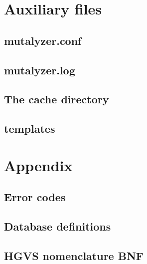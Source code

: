 \documentclass{article}
\begin{document}
\section{Auxiliary files}

\subsection{mutalyzer.conf}

\subsection{mutalyzer.log}

\subsection{The cache directory}

\subsection{templates}

\newpage

\appendix

\section{Appendix}

\subsection{Error codes} \label{subsec:error}


\subsection{Database definitions} \label{subsec:dbtables}


\subsection{HGVS nomenclature BNF} \label{subsec:bnf}


\newpage

{}

\end{document}
